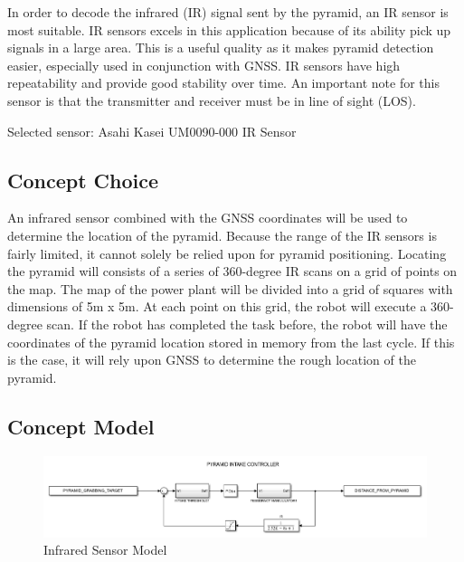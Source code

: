 \documentclass[12pt]{article}
\begin{document}
In order to decode the infrared (IR) signal sent by the pyramid, an IR sensor is most suitable.  IR sensors excels in this application because of its ability pick up signals in a large area. This is a useful quality as it makes pyramid detection easier, especially used in conjunction with GNSS. IR sensors have high repeatability and provide good stability over time. An important note for this sensor is that the transmitter and receiver must be in line of sight (LOS). 

Selected sensor: Asahi Kasei UM0090-000 IR Sensor

\subsection{Concept Choice}
An infrared sensor combined with the GNSS coordinates will be used to determine the location of the pyramid. Because the range of the IR sensors is fairly limited, it cannot solely be relied upon for pyramid positioning. Locating the pyramid will consists of a series of 360-degree IR scans on a grid of points on the map. The map of the power plant will be divided into a grid of squares with dimensions of 5m x 5m. At each point on this grid, the robot will execute a 360-degree scan. If the robot has completed the task before, the robot will have the coordinates of the pyramid location stored in memory from the last cycle. If this is the case, it will rely upon GNSS to determine the rough location of the pyramid. 


\subsection{Concept Model}
\begin{figure}[htb!]
\begin{center}
\caption{Infrared Sensor Model}
\includegraphics[scale=0.6]{Figures/simulink_pyramid}
\end{center}
\end{figure}
\FloatBarrier
\end{document}
